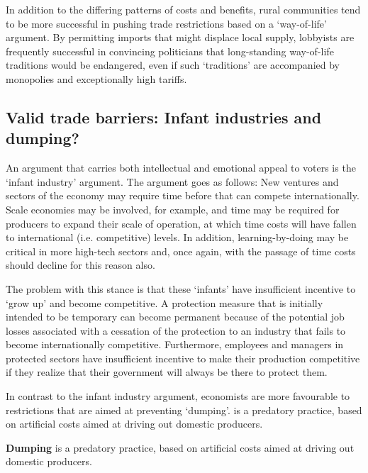 In addition to the differing patterns of costs and benefits, rural
communities tend to be more successful in pushing trade restrictions based
on a `way-of-life' argument. By permitting imports that might displace local
supply, lobbyists are frequently successful in convincing politicians that
long-standing way-of-life traditions would be endangered, even if such
`traditions' are accompanied by monopolies and exceptionally high tariffs.

\newhtmlpage

\subsection*{Valid trade barriers: Infant industries and dumping?}

An argument that carries both intellectual and emotional appeal to voters is
the `infant industry' argument. The argument goes as follows: New ventures
and sectors of the economy may require time before that can compete
internationally. Scale economies may be involved, for example, and time may
be required for producers to expand their scale of operation, at which time
costs will have fallen to international (i.e. competitive) levels. In
addition, learning-by-doing may be critical in more high-tech sectors and,
once again, with the passage of time costs should decline for this reason
also.

The problem with this stance is that these `infants' have insufficient
incentive to `grow up' and become competitive. A protection measure that is
initially intended to be temporary can become permanent because of the
potential job losses associated with a cessation of the protection to an
industry that fails to become internationally competitive. Furthermore,
employees and managers in protected sectors have insufficient incentive to
make their production competitive if they realize that their government will
always be there to protect them.

In contrast to the infant industry argument, economists are more favourable
to restrictions that are aimed at preventing `dumping'. 
is a predatory practice, based on artificial costs aimed at driving out
domestic producers.

\begin{DefBox}
	\textbf{Dumping} is a predatory practice, based on artificial costs aimed at driving out domestic producers.
\end{DefBox}

